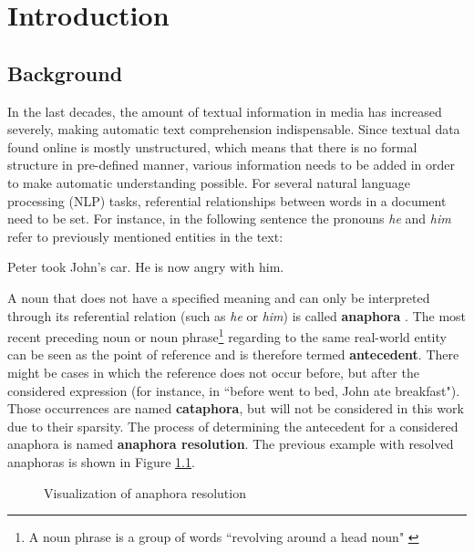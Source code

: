 \chapter{Introduction}
\label{sec:Introduction}

\section{Background}

In the last decades, the amount of textual information in media has increased severely, making automatic text comprehension indispensable. Since textual data found online is mostly unstructured, which means that there is no formal structure in pre-defined manner, various information needs to be added in order to make automatic understanding possible. For several natural language processing (NLP) tasks, referential relationships between words in a document need to be set. For instance, in the following sentence the pronouns \textit{he} and \textit{him} refer to previously mentioned entities in the text:

\begin{center}
Peter took John's car. He is now angry with him.
\end{center}

A noun that does not have a specified meaning and can only be interpreted through its referential relation (such as \textit{he} or \textit{him}) is called \textbf{anaphora} \citep{recasens2007anaphora}. The most recent preceding noun or noun phrase\footnote{A noun phrase is a group of words ``revolving around a head noun" \citep{jurafsky2014speech}} regarding to the same real-world entity can be seen as the point of reference and is therefore termed \textbf{antecedent}. There might be cases in which the reference does not occur before, but after the considered expression (for instance, in ``before  went to bed, John ate breakfast"). Those occurrences are named \textbf{cataphora}, but will not be considered in this work due to their sparsity. The process of determining the antecedent for a considered anaphora is named \textbf{anaphora resolution}. The previous example with resolved anaphoras is shown in Figure \ref{figure:visofanaphora}.

\begin{figure}[h]
	\centering\sffamily
	\caption{Visualization of anaphora resolution}
	\label{figure:visofanaphora}
\end{figure}

